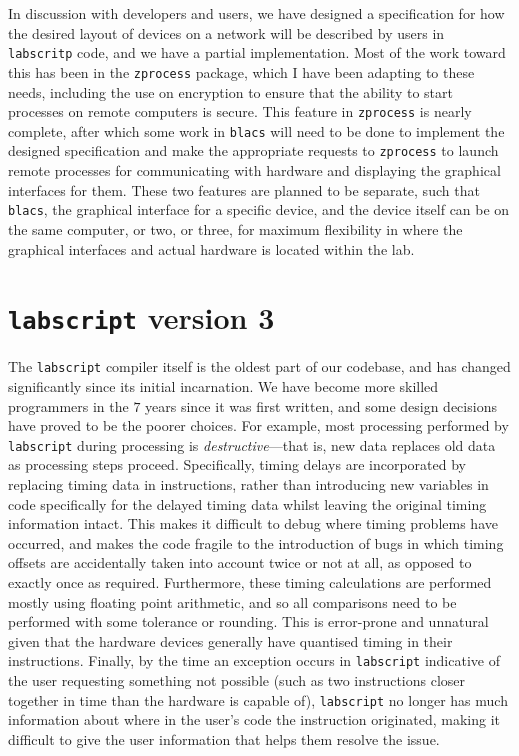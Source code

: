 In discussion with developers and users, we have designed a specification for how the desired layout of devices on a network will be described by users in \texttt{labscritp} code, and we have a partial implementation. Most of the work toward this has been in the \texttt{zprocess} package, which I have been adapting to these needs, including the use on encryption to ensure that the ability to start processes on remote computers is secure. This feature in \texttt{zprocess} is nearly complete, after which some work in \texttt{blacs} will need to be done to implement the designed specification and make the appropriate requests to \texttt{zprocess} to launch remote processes for communicating with hardware and displaying the graphical interfaces for them. These two features are planned to be separate, such that \texttt{blacs}, the graphical interface for a specific device, and the device itself can be on the same computer, or two, or three, for maximum flexibility in where the graphical interfaces and actual hardware is located within the lab.

\section{\texttt{labscript} version 3}

The \texttt{labscript} compiler itself is the oldest part of our codebase, and has changed significantly since its initial incarnation. We have become more skilled programmers in the $7$ years since it was first written, and some design decisions have proved to be the poorer choices. For example, most processing performed by \texttt{labscript} during processing is \emph{destructive}---that is, new data replaces old data as processing steps proceed. Specifically, timing delays are incorporated by replacing timing data in instructions, rather than introducing new variables in code specifically for the delayed timing data whilst leaving the original timing information intact. This makes it difficult to debug where timing problems have occurred, and makes the code fragile to the introduction of bugs in which timing offsets are accidentally taken into account twice or not at all, as opposed to exactly once as required. Furthermore, these timing calculations are performed mostly using floating point arithmetic, and so all comparisons need to be performed with some tolerance or rounding. This is error-prone and unnatural given that the hardware devices generally have quantised timing in their instructions. Finally, by the time an exception occurs in \texttt{labscript} indicative of the user requesting something not possible (such as two instructions closer together in time than the hardware is capable of), \texttt{labscript} no longer has much information about where in the user's code the instruction originated, making it difficult to give the user information that helps them resolve the issue.

